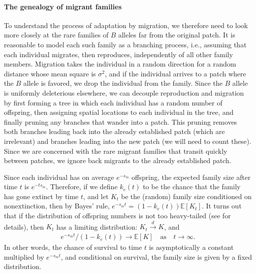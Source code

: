 \documentclass[10pt,letterpaper]{article}
\newcommand{\citet}[1]{\cite{#1}}
\newcommand{\E}{\mathbb{E}}
\newcommand{\dconv}{\xrightarrow{d}}
\begin{document}
\paragraph{The genealogy of migrant families}
\label{ss:migrant_math}

To understand the process of adaptation by migration,
we therefore need to look more closely at the rare families of $B$ alleles 
far from the original patch.
It is reasonable to model each such family as a branching process,
i.e., assuming that each individual
migrates, then reproduces, independently of all other family members.
Migration takes the individual in a random direction
for a random distance whose mean square is $\sigma^2$,
and if the individual arrives to a patch where the $B$ allele is favored, 
we drop the individual from the family.
Since the $B$ allele is uniformly deleterious elsewhere,
we can decouple reproduction and migration
by first forming a tree in which each individual has a random number of offspring,
then assigning spatial locations to each individual in the tree,
and finally pruning any branches that wander into a patch.
This pruning removes both branches leading back into the already established patch (which are irrelevant)
and branches leading into the new patch (we will need to count these).
Since we are concerned with the rare migrant families that transit quickly between patches, 
we ignore back migrants to the already established patch. 

Since each individual has on average $e^{-s_m}$ offspring,
the expected family size after time $t$ is $e^{- t s_m}$.
Therefore, if we define $k_e(t)$ to be the chance that the family
has gone extinct by time $t$, 
and let $K_t$ be the (random) family size conditioned on nonextinction,
then by Bayes' rule, $e^{-s_m t} = (1-k_e(t))\E[K_t]$.
It turns out that if the distribution of offspring numbers is not too heavy-tailed 
(see \citet{jagers1975branching} for details),
then $K_t$ has a limiting distribution: $K_t \dconv K$,
and 
\begin{align} \label{eqn:EK_limit}
    e^{-s_m t}/(1-k_e(t)) \to \E[K] \quad \text{as} \quad t \to \infty .
\end{align}
In other words, the chance of survival to time $t$ is asymptotically a constant multiplied by $e^{-s_m t}$,
and conditional on survival, the family size is given by a fixed distribution.
\end{document}
